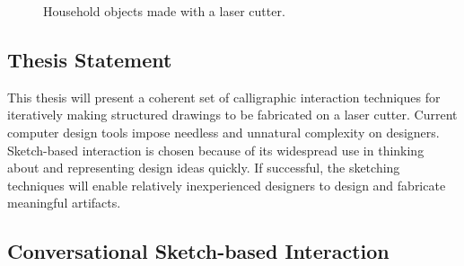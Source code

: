 \documentclass[12pt]{article}
\begin{document}
\begin{figure}
\centering 
{}
\hspace{1cm} 
\caption{Household objects made with a laser cutter.}
\label{fig:flat}
\end{figure}

\subsection{Thesis Statement}

This thesis will present a coherent set of calligraphic interaction
techniques for iteratively making structured drawings to be fabricated
on a laser cutter. Current computer design tools impose needless and
unnatural complexity on designers. Sketch-based interaction is chosen
because of its widespread use in thinking about and representing
design ideas quickly. If successful, the sketching techniques will
enable relatively inexperienced designers to design and fabricate
meaningful artifacts.

\subsection{Conversational Sketch-based Interaction}
\end{document}
